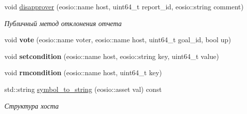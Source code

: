 \begin{DoxyCompactItemize}
$$void \mbox{\hyperlink{classunicore_a403175c6abbcf360d36ec0259bccc109}{disapprover}} (eosio\+::name host, uint64\+\_\+t report\+\_\+id, eosio\+::string comment)
\begin{DoxyCompactList}\small\item\em Публичный метод отклонения отчета \end{DoxyCompactList}\item 
\mbox{\label{classunicore_ac1ca3033e5f65695c938c3d0621e6bfb}} 
void {\bfseries vote} (eosio\+::name voter, eosio\+::name host, uint64\+\_\+t goal\+\_\+id, bool up)
\item 
\mbox{\label{classunicore_a7b973d2c279fca2fa0cc08c35ebf1abe}} 
void {\bfseries setcondition} (eosio\+::name host, eosio\+::string key, uint64\+\_\+t value)
\item 
\mbox{\label{classunicore_a624a721f564fd28c295bdeef482bacc8}} 
void {\bfseries rmcondition} (eosio\+::name host, uint64\+\_\+t key)
\item 
std\+::string \mbox{\hyperlink{classunicore_adb0134644edf42ff41b84bca15e6e8ff}{symbol\+\_\+to\+\_\+string}} (eosio\+::asset val) const
\begin{DoxyCompactList}\small\item\em Структура хоста \end{DoxyCompactList}\end{DoxyCompactItemize}
